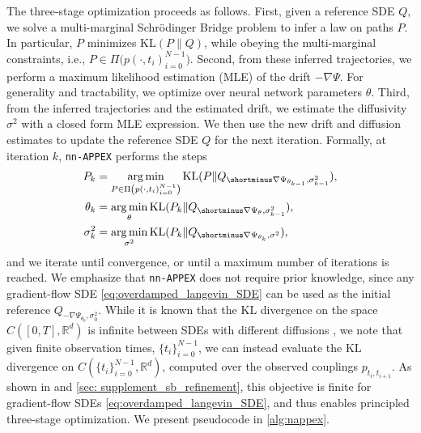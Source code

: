 \documentclass[twoside]{article}
\newcommand{\R} {\mathbb R}
\newcommand{\nappex}{\texttt{nn-APPEX}}
\begin{document}
The three-stage optimization proceeds as follows. First, given a reference SDE $Q$, we solve a multi-marginal Schr\"odinger Bridge problem to infer a law on paths $P$. In particular, $P$ minimizes $\mathrm{KL}(P \| Q)$, while obeying the multi-marginal constraints, i.e., $P  \in \Pi\bigl(p(\cdot, t_i)_{i=0}^{N-1}\bigr)$. Second, from these inferred trajectories, we perform a maximum likelihood estimation (MLE) of the drift $-\nabla \Psi$. For generality and tractability, we optimize over neural network parameters $\theta$. Third, from the inferred trajectories and the estimated drift, we estimate the diffusivity $\sigma^2$ with a closed form MLE expression. We then use the new drift and diffusion estimates to update the reference SDE $Q$ for the next iteration. Formally, at iteration $k$, \nappex{} performs the steps
\begin{align}
    \label{eq: SB_traj_inf_k}
    P_{k} &= \mathop{\arg\min}_{P \in \Pi\left(p(\cdot, t_i)_{i=0}^{N-1}\right)} \mathrm{KL}(P \| Q_{\shortminus\nabla\Psi_{\theta_{k-1}}, \sigma^2_{k-1}}),\\
    \label{eq: drift_MLE_k}
    \theta_{k} &= \mathop{\arg\min}_{\theta} \mathrm{KL}(P_{k} \| Q_{\shortminus \nabla\Psi_{\theta}, \sigma^2_{k-1}}),\\
    \label{eq: diff_MLE_k}
    \sigma^{2}_{k} &= \mathop{\arg\min}_{\sigma^2} \mathrm{KL}(P_{k} \| Q_{\shortminus \nabla\Psi_{\theta_k}, \sigma^2}),
\end{align}
and we iterate until convergence, or until a maximum number of iterations is reached.  
We emphasize that \nappex{} does not require prior knowledge, since any gradient-flow SDE \eqref{eq:overdamped_langevin_SDE} can be used as the initial reference $Q_{-\nabla \Psi_{\theta_0}, \sigma^2_0}$. While it is known that the $\mathrm{KL}$ divergence on the space $C([0,T], \R^d)$ is infinite between SDEs with different diffusions \citep{shen2025multi}, we note that given finite observation times, $\{t_i\}_{i=0}^{N-1}$, we can instead evaluate the $\mathrm{KL}$ divergence on $C(\{t_i\}_{i=0}^{N-1}, \R^d)$, computed over the observed couplings $p_{t_i, t_{i+1}}$. As shown in \citet[Section 4]{guan2024identifying} and \cref{sec: supplement_sb_refinement}, this objective is finite for gradient-flow SDEs \eqref{eq:overdamped_langevin_SDE}, and thus enables principled three-stage optimization. We present pseudocode in \cref{alg:nappex}.
\end{document}
